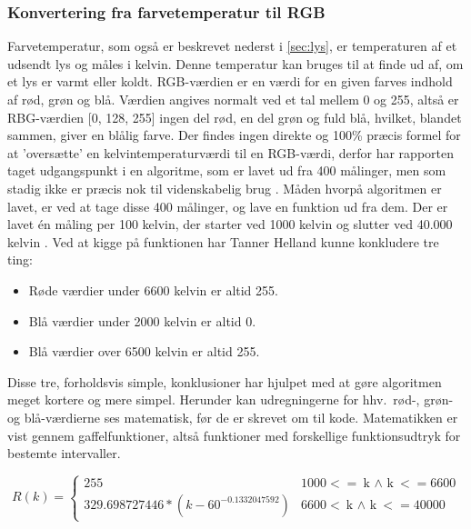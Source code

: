 \subsubsection{Konvertering fra farvetemperatur til RGB}
\label{sec:temptilrgb}
Farvetemperatur, som også er beskrevet nederst i \ref{sec:lys}, er temperaturen af et udsendt lys og måles i kelvin. Denne temperatur kan bruges til at finde ud af, om et lys er varmt eller koldt. 
RGB-værdien er en værdi for en given farves indhold af rød, grøn og blå. Værdien angives normalt ved et tal mellem 0 og 255, altså er RBG-værdien [0, 128, 255] ingen del rød, en del grøn og fuld blå, hvilket, blandet sammen, giver en blålig farve.
Der findes ingen direkte og 100\% præcis formel for at ’oversætte’ en kelvintemperaturværdi til en RGB-værdi, derfor har rapporten taget udgangspunkt i en algoritme, som er lavet ud fra 400 målinger, men som stadig ikke er præcis nok til videnskabelig brug \cite{tanner_helland}.
Måden hvorpå algoritmen er lavet, er ved at tage disse 400 målinger, og lave en funktion ud fra dem. Der er lavet én måling per 100 kelvin, der starter ved 1000 kelvin og slutter ved 40.000 kelvin \cite{charity_values}. Ved at kigge på funktionen \cite{tanner_helland_chart} har Tanner Helland kunne konkludere  tre ting:

\begin{itemize}
\item Røde værdier under 6600 kelvin er altid 255.
\item Blå værdier under 2000 kelvin er altid 0.
\item Blå værdier over 6500 kelvin er altid 255.
\end{itemize}

Disse tre, forholdsvis simple, konklusioner har hjulpet med at gøre algoritmen meget kortere og mere simpel. Herunder kan udregningerne for hhv.\ rød-, grøn- og blå-værdierne ses matematisk, før de er skrevet om til kode. Matematikken er vist gennem gaffelfunktioner, altså funktioner med forskellige funktionsudtryk for bestemte intervaller.


\begin{displaymath}
   R(k) = \left\{
     \begin{array}{lr}
       255 &1000 <= \text{k $\land$ k} <= 6600\\
       329.698727446*(k-60^{-0.1332047592}) &6600 < \text{k $\land$ k} <= 40000
     \end{array}
   \right.
\end{displaymath} 

